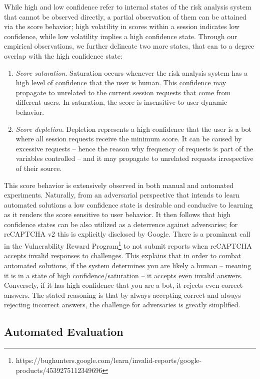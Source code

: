 While high and low confidence refer to internal states of the risk analysis system that cannot be observed directly, a partial observation of them can be attained via the score behavior; high volatility in scores within a session indicates low confidence, while low volatility implies a high confidence state.
Through our empirical observations, we further delineate two more states, that can to a degree overlap with the high confidence state:
\begin{enumerate}
\item \emph{Score saturation}. Saturation occurs whenever the risk analysis system has a high level of confidence that the user is human.
This confidence may propagate to unrelated to the current session requests that come from different users.
In saturation, the score is insensitive to user dynamic behavior.
\item \emph{Score depletion}.
Depletion represents a high confidence that the user is a bot where all session requests receive the minimum score.
It can be caused by excessive requests -- hence the reason why frequency of requests is part of the variables controlled -- and it may propagate to unrelated requests irrespective of their source.
\end{enumerate}

This score behavior is extensively observed in both manual and automated experiments.
Naturally, from an adversarial perspective that intends to learn automated solutions a low confidence state is desirable and conducive to learning as it renders the score sensitive to user behavior.
It then follows that high confidence states can be also utilized as a deterrence against adversaries; for reCAPTCHA v2 this is explicitly disclosed by Google.
There is a prominent call in the Vulnerability Reward Program\footnote{https://bughunters.google.com/learn/invalid-reports/google-products/4539275112349696} to not submit reports when reCAPTCHA accepts invalid responses to challenges.
This explains that in order to combat automated solutions, if the system determines you are likely a human -- meaning it is in a state of high confidence/saturation -- it accepts even invalid answers.
Conversely, if it has high confidence that you are a bot, it rejects even correct answers.
The stated reasoning is that by always accepting correct and always rejecting incorrect answers, the challenge for adversaries is greatly simplified.

\subsection{Automated Evaluation}
\label{sec:auto}

